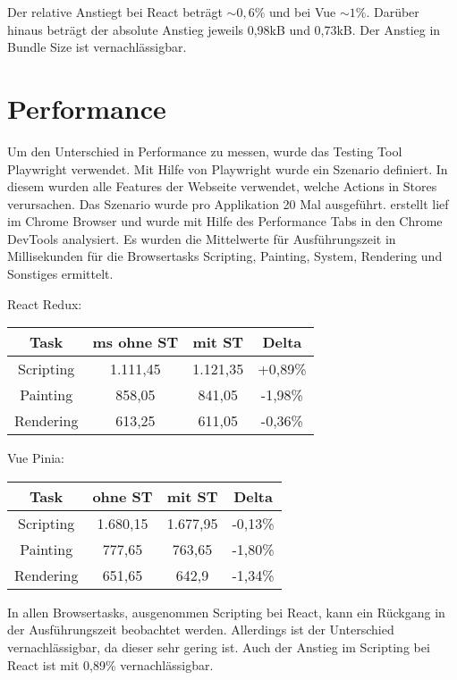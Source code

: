 Der relative Anstiegt bei React beträgt $\sim0,6\%$ und bei Vue $\sim1\%$. Darüber hinaus beträgt der absolute Anstieg jeweils 0,98kB und 0,73kB. Der Anstieg in Bundle Size ist vernachlässigbar.

\section{Performance}

Um den Unterschied in Performance zu messen, wurde das Testing Tool Playwright verwendet. Mit Hilfe von Playwright wurde ein Szenario definiert. In diesem wurden alle Features der Webseite verwendet, welche Actions in Stores verursachen. Das Szenario wurde pro Applikation 20 Mal ausgeführt. erstellt lief im Chrome Browser und wurde mit Hilfe des Performance Tabs in den Chrome DevTools analysiert. Es wurden die Mittelwerte für Ausführungszeit in Millisekunden für die Browsertasks Scripting, Painting, System, Rendering und Sonstiges ermittelt.

React Redux:

\begin{center}
  \begin{tabular}{|c|c|c|c|} 
   \hline
   Task & ms ohne ST & mit ST & Delta \\ [0.5ex]
   \hline\hline
   Scripting & 1.111,45 & 1.121,35 & +0,89\% \\
   \hline
   Painting & 858,05 & 841,05 & -1,98\% \\
   \hline
   Rendering & 613,25 & 611,05 & -0,36\% \\
   \hline
  \end{tabular}
\end{center}

Vue Pinia:

\begin{center}
  \begin{tabular}{|c|c|c|c|} 
   \hline
   Task & ohne ST & mit ST & Delta \\ [0.5ex]
   \hline\hline
   Scripting & 1.680,15 & 1.677,95 & -0,13\% \\
   \hline
   Painting & 777,65 & 763,65 & -1,80\% \\
   \hline
   Rendering & 651,65 & 642,9 & -1,34\% \\
   \hline
  \end{tabular}
\end{center}

In allen Browsertasks, ausgenommen Scripting bei React, kann ein Rückgang in der Ausführungszeit beobachtet werden. Allerdings ist der Unterschied vernachlässigbar, da dieser sehr gering ist. Auch der Anstieg im Scripting bei React ist mit 0,89\% vernachlässigbar.

